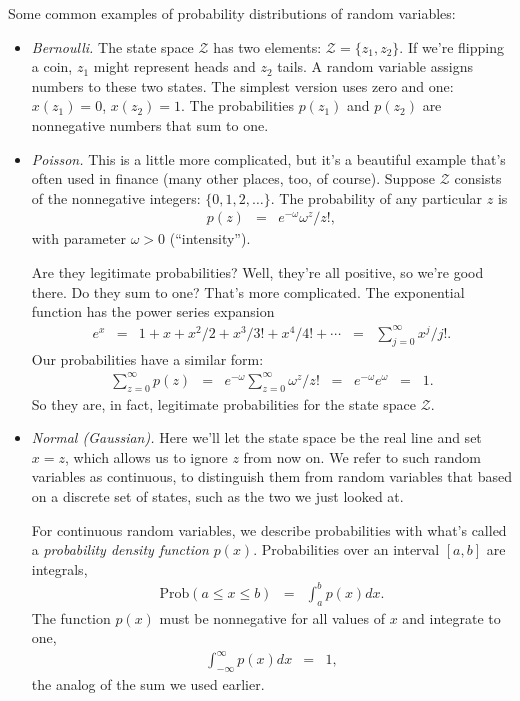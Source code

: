 \documentclass[11pt]{article}
\begin{document}
Some common examples of probability distributions of random variables:
%
\begin{itemize}
\item {\it Bernoulli.\/}
The state space $\mathcal{Z}$ has two elements:  $\mathcal{Z} = \{z_1, z_2\}$.
If we're flipping a coin, $z_1$ might represent heads and $z_2$ tails.
A random variable assigns numbers to these two states.
The simplest version uses zero and one:
$x(z_1) = 0$, $x(z_2) = 1$.
The probabilities $p(z_1)$ and $p(z_2)$ are nonnegative numbers that sum to one.


\item {\it Poisson.\/}
This is a little more complicated, but it's a beautiful example
that's often used in finance (many other places, too, of course).
Suppose $\mathcal{Z}$ consists of the nonnegative integers:  $\{ 0, 1, 2, \ldots \}$.
The probability of any particular $z$ is
\begin{eqnarray*}
    p(z) &=& e^{-\omega} \omega^z/z! ,
\end{eqnarray*}
with parameter $\omega > 0$ (``intensity'').  


Are they legitimate probabilities?
Well, they're all positive, so we're good there.
Do they sum to one?
That's more complicated.
The exponential function has the power series expansion
\begin{eqnarray}
    e^x &=& 1 + x + x^2/2 + x^3/3! + x^4/4! + \cdots
            \;\;=\;\; \sum_{j=0}^\infty x^j/j!.
    \label{eq:eofx-powerseries}
\end{eqnarray}
Our probabilities have  a similar form:
\begin{eqnarray*}
    \sum_{z=0}^\infty p(z) &=& e^{-\omega} \sum_{z=0}^\infty \omega^z/z!
                \;\;=\;\; e^{-\omega} e^{\omega}
                \;\;=\;\; 1.
\end{eqnarray*}
So they are, in fact, legitimate probabilities for the state space $\mathcal{Z}$.

\item {\it Normal (Gaussian).\/}
Here we'll let the state space be the real line
and set $x=z$, which allows us to ignore $z$ from now on.
We refer to such random variables as continuous,
to distinguish them from random variables that
based on a discrete set of states, such as the two we just looked at.

For continuous random variables,
we describe probabilities
with what's called a {\it probability density function\/} $p(x)$.
Probabilities over an interval $[a,b]$ are integrals,
\begin{eqnarray*}
    \mbox{Prob} ( a\leq x \leq b ) &=& \int_{a}^b p(x) dx .
\end{eqnarray*}
The function $p(x)$ must be nonnegative for all values of $x$
and integrate to one,
\begin{eqnarray*}
    \int_{-\infty}^\infty p(x) dx &=& 1 ,
\end{eqnarray*}
the analog of the sum we used earlier.


\end{itemize}
\end{document}
